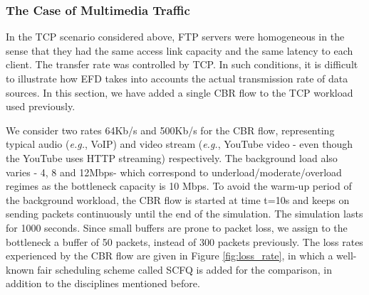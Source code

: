 \documentclass[preprint,12pt]{elsarticle}
\begin{document}




\subsubsection{The Case of Multimedia Traffic}\label{sec:multi_media}
In the TCP scenario considered above, FTP servers were homogeneous in the sense that they had the same access link capacity and the same latency to each client. The transfer rate was controlled by TCP. In such conditions, it is difficult to illustrate how EFD takes into accounts the actual transmission rate of data sources. In this section, we have added a single CBR flow to the TCP workload used previously.%

We consider two  rates 64Kb/s and 500Kb/s for the CBR flow, representing typical audio (\textit{e.g.}, VoIP) and video stream (\textit{e.g.}, YouTube video - even though the YouTube uses HTTP streaming)  respectively. The background load also varies - 4, 8 and 12Mbps-  which correspond to underload/moderate/overload regimes as the bottleneck capacity is 10 Mbps. To avoid the warm-up period of the background workload, the CBR flow is started at time t=10s and keeps on sending packets continuously until the end of the simulation. The simulation lasts for 1000 seconds. Since small buffers are prone to packet loss, we assign to the bottleneck a buffer of 50 packets, instead of 300 packets previously. The loss rates experienced by the CBR flow are given in Figure \ref{fig:loss_rate}, in which a well-known fair scheduling scheme called SCFQ \cite{Golestani94} is added for the comparison, in addition to the disciplines mentioned before.
\end{document}
